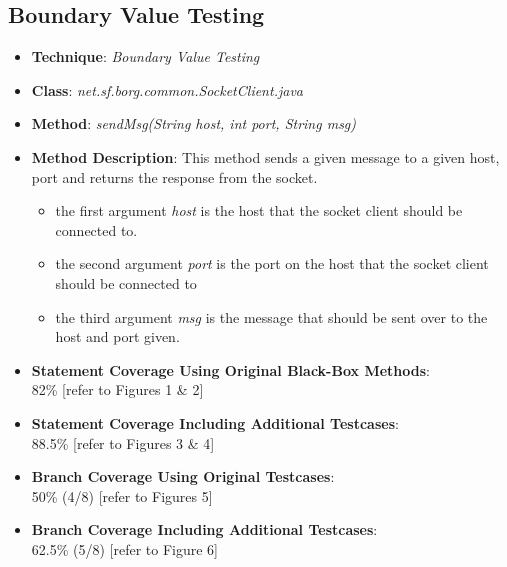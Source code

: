 \documentclass[fontsize=12pt,paper=letter,twoside]{scrartcl}
\begin{document}
\newpage
\subsection{Boundary Value Testing}
\begin{itemize}
\item \textbf{Technique}: \emph{Boundary Value Testing}
\item \textbf{Class}: \emph{net.sf.borg.common.SocketClient.java}
\item \textbf{Method}: \emph{sendMsg(String host, int port, String msg)}
\item \textbf{Method Description}: This method sends a given message to a given host, port and returns the response from the socket.
\begin{itemize}
\item the first argument \emph{host} is the host that the socket client should be connected to.
\item the second argument \emph{port} is the port on the host that the socket client should be connected to
\item the third argument \emph{msg} is the message that should be sent over to the host and port given.
\end{itemize}

\item \textbf{Statement Coverage Using Original Black-Box Methods}: \\ 82\%  [refer to Figures 1 \& 2]
\item \textbf{Statement Coverage Including Additional Testcases}: \\ 88.5\% [refer to Figures 3 \& 4]

\item \textbf{Branch Coverage Using Original Testcases}: \\ 50\% (4/8) [refer to Figures 5]
\item \textbf{Branch Coverage Including Additional Testcases}: \\ 62.5\% (5/8) [refer to Figure 6]


\end{itemize}
\end{document}
